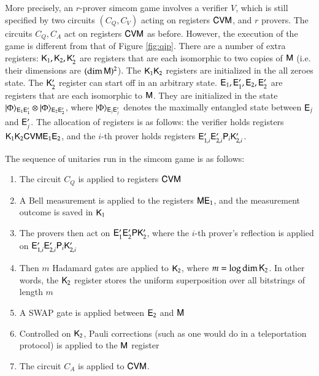 More precisely, an $r$-prover simcom game involves a verifier $V$, which 
is still specified by two circuits $(C_Q,C_V)$ acting on registers ${\mathsf{C}} {\mathsf{V}} {\mathsf{M}}$, and $r$ provers. The circuits $C_Q, C_A$ act on registers ${\mathsf{C}} {\mathsf{V}} {\mathsf{M}}$ as before. However, the execution of the game is different from that of Figure \ref{fig:qip}. There are a number of extra registers: ${\mathsf{K}}_1,{\mathsf{K}}_2,{\mathsf{K}}_2'$ are registers that are each isomorphic to two copies of ${\mathsf{M}}$ (i.e. their dimensions are $(\dim {\mathsf{M}})^2$). The ${\mathsf{K}}_1 {\mathsf{K}}_2$ registers are initialized in the all zeroes state. The ${\mathsf{K}}_2'$ register can start off in an arbitrary state. ${\mathsf{E}}_1,{\mathsf{E}}_1',{\mathsf{E}}_2,{\mathsf{E}}_2'$ are registers that are each isomorphic to ${\mathsf{M}}$. They are initialized in the state  $|\Phi\rangle_{{\mathsf{E}}_{1} {\mathsf{E}}_{1}'} \otimes |\Phi\rangle_{{\mathsf{E}}_{2} {\mathsf{E}}_{2}'}$, where $|\Phi\rangle_{{\mathsf{E}}_j {\mathsf{E}}_j'}$ denotes the maximally entangled state between ${\mathsf{E}}_j$ and ${\mathsf{E}}_j'$. The allocation of registers is as follows: the verifier holds registers ${\mathsf{K}}_1 {\mathsf{K}}_2 {\mathsf{C}} {\mathsf{V}} {\mathsf{M}} {\mathsf{E}}_1 {\mathsf{E}}_2$, and the $i$-th prover holds registers ${\mathsf{E}}_{1,i}' {\mathsf{E}}_{2,i}' {\mathsf{P}}_i {\mathsf{K}}_{2,i}'$. 

\medskip
\noindent The sequence of unitaries run in the simcom game is as follows:
\begin{enumerate}
	\item The circuit $C_Q$ is applied to registers ${\mathsf{C}} {\mathsf{V}} {\mathsf{M}}$
	\item A Bell measurement is applied to the registers ${\mathsf{M}} {\mathsf{E}}_1$, and the measurement outcome is saved in ${\mathsf{K}}_1$
	\item The provers then act on ${\mathsf{E}}_1' {\mathsf{E}}_2' {\mathsf{P}} {\mathsf{K}}_2'$, where the $i$-th prover's reflection is applied on ${\mathsf{E}}_{1,i}' {\mathsf{E}}_{2,i}' {\mathsf{P}}_i {\mathsf{K}}_{2,i}'$
	\item Then $m$ Hadamard gates are applied to ${\mathsf{K}}_2$, where $m = \log \dim {\mathsf{K}}_2$. In other words, the ${\mathsf{K}}_2$ register stores the uniform superposition over all bitstrings of length $m$
	\item A SWAP gate is applied between ${\mathsf{E}}_2$ and ${\mathsf{M}}$
	\item Controlled on ${\mathsf{K}}_2$, Pauli corrections (such as one would do in a teleportation protocol) is applied to the ${\mathsf{M}}$ register
	\item The circuit $C_A$ is applied to ${\mathsf{C}} {\mathsf{V}} {\mathsf{M}}$.
\end{enumerate}


